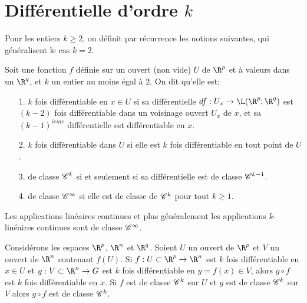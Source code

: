 \documentclass[class=report,crop=false]{standalone}
\begin{document}
\section{Diff\'erentielle d'ordre $k$}
\noindent Pour les entiers $k \geq 2$, on d\'efinit par r\'ecurrence les notions suivantes, qui g\'en\'eralisent le cas $k=2$.

\begin{definition}
\textcolor[rgb]{0.73,0.00,0.00}{
 Soit une fonction $f$  d\'efinie sur un ouvert (non vide) $U$ de $\R^p$  et \`a valeurs dans un
  $\R^q$, et $k$ un entier au moins \'egal \`a $2$. On dit qu'elle est:
  \begin{itemize}
    \item[1.] $k$ fois diff\'erentiable en $x \in U$  si
    sa diff\'erentielle $df: U_x \rightarrow \L(\R^p;\R^q)$ est $(k-2)$ fois diff\'erentiable dans un voisinage ouvert $U_x$ de $x$, et sa $(k-1)^{i\grave{e}me}$ différentielle est diff\'erentiable en $x$.
    \item[2.] $k$ fois diff\'erentiable dans $U$ si elle est $k$ fois diff\'erentiable en tout point de $U$.
    \item[3.] de classe $\mathscr{C}^k$ si et seulement si sa diff\'erentielle est de classe $\mathscr{C}^{k-1}$.
    \item[4.] de classe $\mathscr{C}^{\infty}$ si elle est de classe de $\mathscr{C}^k$ pour tout $k \geq 1$.
  \end{itemize}
}
 \end{definition}



\begin{proposition}
\textcolor[rgb]{0.44,0.00,0.87}{ 
Les applications lin\'eaires continues et plus g\'en\'eralement les applications $k$-lin\'eaires continues sont de classe $\mathscr{C}^{\infty}$.
  }
\end{proposition}

\begin{theoreme}
\textcolor[rgb]{0.44,0.00,0.87}{
Considérons les espaces  $\R^p$, $\R^n$ et $\R^q$. Soient $U$ un ouvert de $\R^p$ et $V$ un ouvert de $\R^n$ contenant $f(U)$. Si
  $f: U \subset \R^p \rightarrow \R^n$ est $k$ fois diff\'erentiable en $x \in U$ et $g: V \subset \R^n \rightarrow G$
  est $k$ fois diff\'erentiable en $y=f(x) \in V$, alors $g \circ f$ est $k$ fois diff\'erentiable en $x$. Si $f$
  est de classe $\mathscr{C}^k$ sur $U$ et $g$ est de classe $\mathscr{C}^k$ sur $V$ alors $g \circ f$ est de classe $\mathscr{C}^k$.
 }
\end{theoreme}
\end{document}
